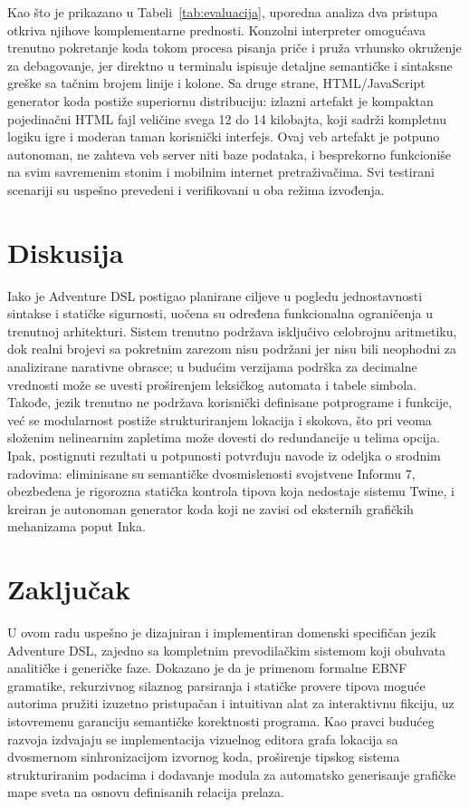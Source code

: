 \documentclass[12pt,a4paper]{article}
\begin{document}
Kao što je prikazano u Tabeli~\ref{tab:evaluacija}, uporedna analiza dva pristupa otkriva njihove komplementarne prednosti. Konzolni interpreter omogućava trenutno pokretanje koda tokom procesa pisanja priče i pruža vrhunsko okruženje za debagovanje, jer direktno u terminalu ispisuje detaljne semantičke i sintaksne greške sa tačnim brojem linije i kolone. Sa druge strane, HTML/JavaScript generator koda postiže superiornu distribuciju: izlazni artefakt je kompaktan pojedinačni HTML fajl veličine svega 12 do 14 kilobajta, koji sadrži kompletnu logiku igre i moderan taman korisnički interfejs. Ovaj veb artefakt je potpuno autonoman, ne zahteva veb server niti baze podataka, i besprekorno funkcioniše na svim savremenim stonim i mobilnim internet pretraživačima. Svi testirani scenariji su uspešno prevedeni i verifikovani u oba režima izvođenja.

\section{Diskusija}
Iako je Adventure DSL postigao planirane ciljeve u pogledu jednostavnosti sintakse i statičke sigurnosti, uočena su određena funkcionalna ograničenja u trenutnoj arhitekturi. Sistem trenutno podržava isključivo celobrojnu aritmetiku, dok realni brojevi sa pokretnim zarezom nisu podržani jer nisu bili neophodni za analizirane narativne obrasce; u budućim verzijama podrška za decimalne vrednosti može se uvesti proširenjem leksičkog automata i tabele simbola. Takođe, jezik trenutno ne podržava korisnički definisane potprograme i funkcije, već se modularnost postiže strukturiranjem lokacija i skokova, što pri veoma složenim nelinearnim zapletima može dovesti do redundancije u telima opcija. Ipak, postignuti rezultati u potpunosti potvrđuju navode iz odeljka o srodnim radovima: eliminisane su semantičke dvosmislenosti svojstvene Informu 7, obezbeđena je rigorozna statička kontrola tipova koja nedostaje sistemu Twine, i kreiran je autonoman generator koda koji ne zavisi od eksternih grafičkih mehanizama poput Inka.

\section{Zaključak}
U ovom radu uspešno je dizajniran i implementiran domenski specifičan jezik Adventure DSL, zajedno sa kompletnim prevodilačkim sistemom koji obuhvata analitičke i generičke faze. Dokazano je da je primenom formalne EBNF gramatike, rekurzivnog silaznog parsiranja i statičke provere tipova moguće autorima pružiti izuzetno pristupačan i intuitivan alat za interaktivnu fikciju, uz istovremenu garanciju semantičke korektnosti programa. Kao pravci budućeg razvoja izdvajaju se implementacija vizuelnog editora grafa lokacija sa dvosmernom sinhronizacijom izvornog koda, proširenje tipskog sistema strukturiranim podacima i dodavanje modula za automatsko generisanje grafičke mape sveta na osnovu definisanih relacija prelaza.
\end{document}
